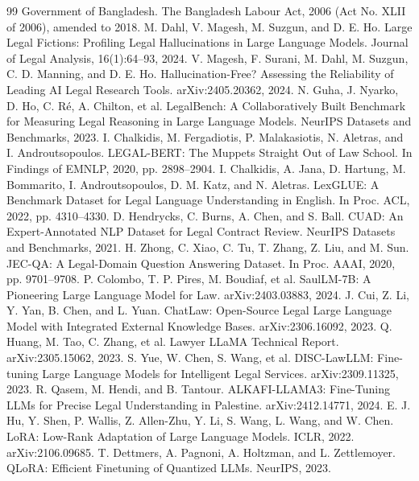\documentclass[11pt,a4paper]{article}
\begin{document}
\begin{thebibliography}{99}
 Government of Bangladesh. The Bangladesh Labour Act, 2006 (Act No. XLII of 2006), amended to 2018.
 M. Dahl, V. Magesh, M. Suzgun, and D. E. Ho. Large Legal Fictions: Profiling Legal Hallucinations in Large Language Models. Journal of Legal Analysis, 16(1):64--93, 2024.
 V. Magesh, F. Surani, M. Dahl, M. Suzgun, C. D. Manning, and D. E. Ho. Hallucination-Free? Assessing the Reliability of Leading AI Legal Research Tools. arXiv:2405.20362, 2024.
 N. Guha, J. Nyarko, D. Ho, C. R\'{e}, A. Chilton, et al. LegalBench: A Collaboratively Built Benchmark for Measuring Legal Reasoning in Large Language Models. NeurIPS Datasets and Benchmarks, 2023.
 I. Chalkidis, M. Fergadiotis, P. Malakasiotis, N. Aletras, and I. Androutsopoulos. LEGAL-BERT: The Muppets Straight Out of Law School. In Findings of EMNLP, 2020, pp. 2898--2904.
 I. Chalkidis, A. Jana, D. Hartung, M. Bommarito, I. Androutsopoulos, D. M. Katz, and N. Aletras. LexGLUE: A Benchmark Dataset for Legal Language Understanding in English. In Proc. ACL, 2022, pp. 4310--4330.
 D. Hendrycks, C. Burns, A. Chen, and S. Ball. CUAD: An Expert-Annotated NLP Dataset for Legal Contract Review. NeurIPS Datasets and Benchmarks, 2021.
 H. Zhong, C. Xiao, C. Tu, T. Zhang, Z. Liu, and M. Sun. JEC-QA: A Legal-Domain Question Answering Dataset. In Proc. AAAI, 2020, pp. 9701--9708.
 P. Colombo, T. P. Pires, M. Boudiaf, et al. SaulLM-7B: A Pioneering Large Language Model for Law. arXiv:2403.03883, 2024.
 J. Cui, Z. Li, Y. Yan, B. Chen, and L. Yuan. ChatLaw: Open-Source Legal Large Language Model with Integrated External Knowledge Bases. arXiv:2306.16092, 2023.
 Q. Huang, M. Tao, C. Zhang, et al. Lawyer LLaMA Technical Report. arXiv:2305.15062, 2023.
 S. Yue, W. Chen, S. Wang, et al. DISC-LawLLM: Fine-tuning Large Language Models for Intelligent Legal Services. arXiv:2309.11325, 2023.
 R. Qasem, M. Hendi, and B. Tantour. ALKAFI-LLAMA3: Fine-Tuning LLMs for Precise Legal Understanding in Palestine. arXiv:2412.14771, 2024.
 E. J. Hu, Y. Shen, P. Wallis, Z. Allen-Zhu, Y. Li, S. Wang, L. Wang, and W. Chen. LoRA: Low-Rank Adaptation of Large Language Models. ICLR, 2022. arXiv:2106.09685.
 T. Dettmers, A. Pagnoni, A. Holtzman, and L. Zettlemoyer. QLoRA: Efficient Finetuning of Quantized LLMs. NeurIPS, 2023.

\end{thebibliography}
\end{document}
